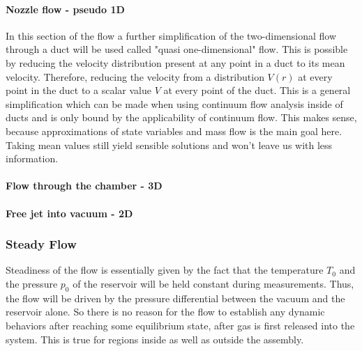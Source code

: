	\paragraph{Nozzle flow - pseudo 1D}
		In this section of the flow a further simplification of the two-dimensional flow through a duct will be used called "quasi one-dimensional" flow.
		This is possible by reducing the velocity distribution present at any point in a duct to its mean velocity.
		Therefore, reducing the velocity from a distribution $V(r)$ at every point in the duct to a scalar value $V$ at every point of the duct.
		This is a general simplification which can be made when using continuum flow analysis inside of ducts and is only bound by the applicability of continuum flow.
		This makes sense, because approximations of state variables and mass flow is the main goal here.
		Taking mean values still yield sensible solutions and won't leave us with less information.

	\paragraph*{Flow through the chamber - 3D}

	\paragraph{Free jet into vacuum - 2D}


	\cite{anderson2021modern}

\subsubsection*{Steady Flow}

	Steadiness of the flow is essentially given by the fact that the temperature $T_0$ and the pressure $p_0$ of the reservoir will be held constant during measurements.
	Thus, the flow will be driven by the pressure differential between the vacuum and the reservoir alone.
	So there is no reason for the flow to establish any dynamic behaviors after reaching some equilibrium state, after gas is first released into the system.
	This is true for regions inside as well as outside the assembly.
